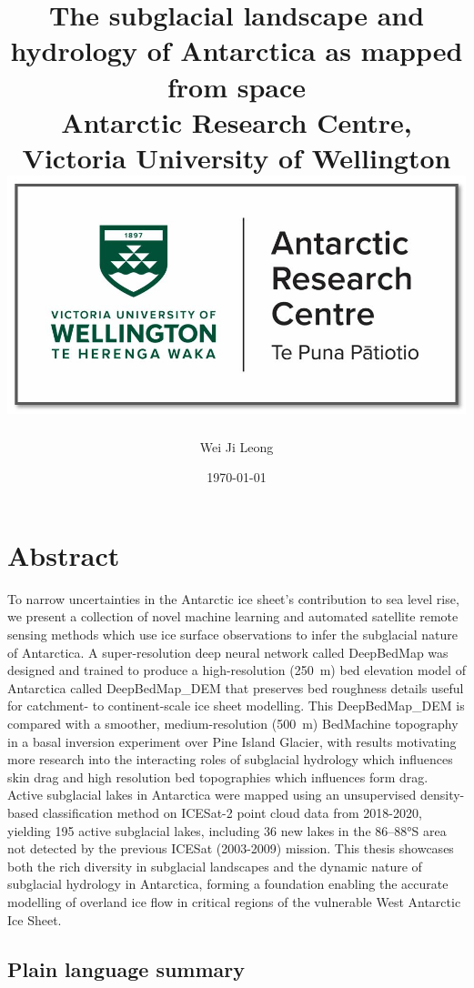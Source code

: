 \documentclass[12pt,twoside]{book}
\title{
{The subglacial landscape and hydrology of Antarctica as mapped from space}\\
{\large Antarctic Research Centre, Victoria University of Wellington}\\
{\includegraphics[scale=0.5]{0_arc_logo.jpg}}
}
\author{Wei Ji Leong}
\date{\today}
\begin{document}


\chapter*{Abstract}

To narrow uncertainties in the Antarctic ice sheet's contribution to sea level rise, we present a collection of novel machine learning and automated satellite remote sensing methods which use ice surface observations to infer the subglacial nature of Antarctica.
A super-resolution deep neural network called DeepBedMap was designed and trained to produce a high-resolution (\SI{250}{\metre}) bed elevation model of Antarctica called DeepBedMap\_DEM that preserves bed roughness details useful for catchment- to continent-scale ice sheet modelling.
This DeepBedMap\_DEM is compared with a smoother, medium-resolution (\SI{500}{\metre}) BedMachine topography in a basal inversion experiment over Pine Island Glacier, with results motivating more research into the interacting roles of subglacial hydrology which influences skin drag and high resolution bed topographies which influences form drag.
Active subglacial lakes in Antarctica were mapped using an unsupervised density-based classification method on ICESat-2 point cloud data from 2018-2020, yielding 195 active subglacial lakes, including 36 new lakes in the 86--88°S area not detected by the previous ICESat (2003-2009) mission.
This thesis showcases both the rich diversity in subglacial landscapes and the dynamic nature of subglacial hydrology in Antarctica, forming a foundation enabling the accurate modelling of overland ice flow in critical regions of the vulnerable West Antarctic Ice Sheet.

\section*{Plain language summary}
\end{document}
